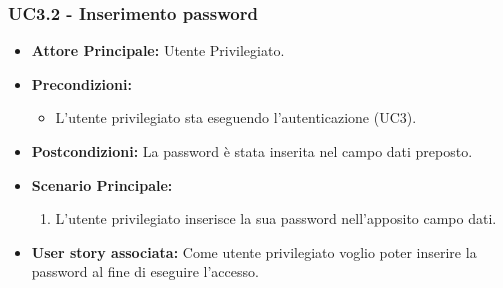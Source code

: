 \documentclass[11pt]{article}
\begin{document}
\begin{justify}
\subsubsection{\textbf{UC3.2 - Inserimento password}}
\begin{itemize}
     \item \textbf{Attore Principale:} Utente Privilegiato.
     \item \textbf{Precondizioni:} 
        \begin{itemize}
            \item L'utente privilegiato sta eseguendo l'autenticazione (UC3).
        \end{itemize}
     \item \textbf{Postcondizioni:} La password è stata inserita nel campo dati preposto.
     \item \textbf{Scenario Principale:}
        \begin{enumerate}
            \item L'utente privilegiato inserisce la sua password nell'apposito campo dati.
        \end{enumerate}
     \item \textbf{User story associata:} Come utente privilegiato voglio poter inserire la password al fine di eseguire l'accesso.
\end{itemize}

\end{justify}
\end{document}
